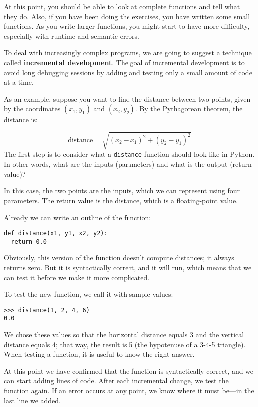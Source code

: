 At this point, you should be able to look at complete functions
and tell what they do.  Also, if you have been doing the exercises,
you have written some small functions.  As you write
larger functions, you might start to have more difficulty,
especially with runtime and semantic errors.

To deal with increasingly complex programs,
we are going to suggest a technique called
{\bf incremental development}.  The goal of incremental development
is to avoid long debugging sessions by adding and testing only
a small amount of code at a time.


As an example, suppose you want to find the distance between two
points, given by the coordinates $(x_1, y_1)$ and $(x_2, y_2)$.
By the Pythagorean theorem, the distance is:

\begin{displaymath}
\mathrm{distance} = \sqrt{(x_2 - x_1)^2 + (y_2 - y_1)^2}
\end{displaymath}
%
The first step is to consider what a {\tt distance} function should
look like in Python. In other words, what are the inputs (parameters)
and what is the output (return value)?

In this case, the two points are the inputs, which we can represent
using four parameters.  The return value is the distance, which is
a floating-point value.

Already we can write an outline of the function:

\beforeverb
\begin{verbatim}
def distance(x1, y1, x2, y2):
  return 0.0
\end{verbatim}
\afterverb
%
Obviously, this version of the function doesn't compute distances; it
always returns zero.  But it is syntactically correct, and it will
run, which means that we can test it before we make it more
complicated.

To test the new function, we call it with sample values:

\beforeverb
\begin{verbatim}
>>> distance(1, 2, 4, 6)
0.0
\end{verbatim}
\afterverb
%
We chose these values so that the horizontal distance equals 3 and the
vertical distance equals 4; that way, the result is 5
(the hypotenuse of a 3-4-5 triangle). When testing a function, it is
useful to know the right answer.

At this point we have confirmed that the function is syntactically
correct, and we can start adding lines of code.  After each
incremental change, we test the function again.  If an error occurs at
any point, we know where it must be---in the last line
we added.

